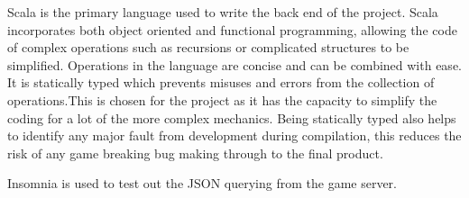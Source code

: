 Scala is the primary language used to write the back end of the project. Scala incorporates both object oriented and functional programming, allowing the code of complex operations such as recursions or complicated structures to be simplified. Operations in the language are concise and can be combined with ease. It is statically typed which prevents misuses and errors from the collection of operations.This is chosen for the project as it has the capacity to simplify the coding for a lot of the more complex mechanics. Being statically typed also helps to identify any major fault from development during compilation, this reduces the risk of any game breaking bug making through to the final product.  







Insomnia is used to test out the JSON querying from the game server. 









